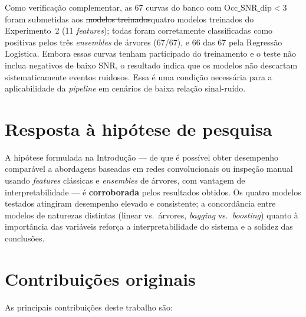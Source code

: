 \documentclass[msc]{on} %
\makeatletter
\providecommand{\DIFaddtex}[1]{{\protect\color{red}#1}} %
\providecommand{\DIFdeltex}[1]{{\protect\color{red}\sout{#1}}} %
\providecommand{\DIFaddbegin}{} %
\providecommand{\DIFaddend}{} %
\providecommand{\DIFdelbegin}{} %
\providecommand{\DIFdelend}{} %
\providecommand{\DIFadd}[1]{\texorpdfstring{\DIFaddtex{#1}}{#1}} %
\providecommand{\DIFdel}[1]{\texorpdfstring{\DIFdeltex{#1}}{}} %
\let\sout@orig\sout %
\renewcommand{\sout}[1]{\ifmmode\text{\sout@orig{\ensuremath{#1}}}\else\sout@orig{#1}\fi} %
\makeatother
\begin{document}
Como verificação complementar, as 67 curvas do banco com $\mathrm{Occ\_SNR\_dip} < 3$ foram submetidas aos \DIFdelbegin \DIFdel{modelos treinados}\DIFdelend \DIFaddbegin \DIFadd{quatro modelos treinados do Experimento~2 (11 }\textit{\DIFadd{features}}\DIFadd{)}\DIFaddend ; todas foram corretamente classificadas como positivas pelos três \textit{ensembles} de árvores (67/67), e 66 das 67 pela Regressão Logística. Embora essas curvas tenham participado do treinamento e o teste não inclua negativos de baixo SNR, o resultado indica que os modelos não descartam sistematicamente eventos ruidosos. Essa é uma condição necessária para a aplicabilidade da \textit{pipeline} em cenários de baixa relação sinal-ruído.

\section{Resposta à hipótese de pesquisa}

A hipótese formulada na Introdução --- de que é possível obter desempenho comparável a abordagens baseadas em redes convolucionais ou inspeção manual usando \textit{features} clássicas e \textit{ensembles} de árvores, com vantagem de interpretabilidade --- é \textbf{corroborada} pelos resultados obtidos. Os quatro modelos testados atingiram desempenho elevado e consistente; a concordância entre modelos de naturezas distintas (linear vs.\ árvores, \textit{bagging} vs.\ \textit{boosting}) quanto à importância das variáveis reforça a interpretabilidade do sistema e a solidez das conclusões.

\section{Contribuições originais}

As principais contribuições deste trabalho são:
\end{document}
